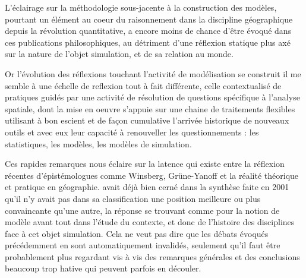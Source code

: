 L'éclairage sur la méthodologie sous-jacente à la construction des modèles, pourtant un élément au coeur du raisonnement dans la discipline géographique depuis la révolution quantitative, a encore moins de chance d'être évoqué dans ces publications philosophiques, au détriment d'une réflexion statique plus axé sur la nature de l'objet simulation, et de sa relation au monde.

Or l'évolution des réflexions touchant l'activité de modélisation se construit il me semble à une échelle de reflexion tout à fait différente, celle contextualisé de pratiques guidés par une activité de résolution de questions spécifique à l'analyse spatiale, dont la mise en oeuvre s'appuie sur une chaine de traitements flexibles utilisant à bon escient et de façon cumulative l'arrivée historique de nouveaux outils et avec eux leur capacité à renouveller les questionnements : les statistiques, les modèles, les modèles de simulation.



Ces rapides remarques nous éclaire sur la latence qui existe entre la réflexion récentes d'épistémologues comme Winsberg, Grüne-Yanoff et la réalité théorique et pratique en géographie. \textcite{Varenne2001} avait déjà bien cerné dans la synthèse faite en 2001 qu'il n'y avait pas dans sa classification une position meilleure ou plus convaincante qu'une autre, la réponse se trouvant comme pour la notion de modèle avant tout dans l'étude du contexte, et donc de l'histoire des disciplines face à cet objet simulation.  Cela ne veut pas dire que les débats évoqués précédemment en sont automatiquement invalidés, seulement qu'il faut être probablement plus regardant vis à vis des remarques générales et des conclusions beaucoup trop hative qui peuvent parfois en découler. 

